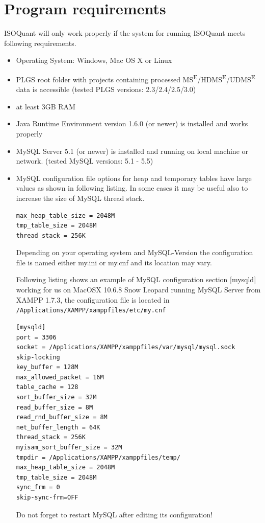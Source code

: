 \documentclass[]{article}
\begin{document}
\clearpage

\section{Program requirements}\label{program-requirements}

ISOQuant will only work properly if the system for running ISOQuant
meets following requirements.

\begin{itemize}
\item
  Operating System: Windows, Mac OS X or Linux
\item
  PLGS root folder with projects containing processed
  MS\textsuperscript{E}/HDMS\textsuperscript{E}/UDMS\textsuperscript{E}
  data is accessible (tested PLGS versions: 2.3/2.4/2.5/3.0)
\item
  at least 3GB RAM
\item
  Java Runtime Environment version 1.6.0 (or newer) is installed and
  works properly
\item
  MySQL Server 5.1 (or newer) is installed and running on local machine
  or network. (tested MySQL versions: 5.1 - 5.5)
\item
  MySQL configuration file options for heap and temporary tables have
  large values as shown in following listing. In some cases it may be
  useful also to increase the size of MySQL thread stack.

\begin{lstlisting}
max_heap_table_size = 2048M
tmp_table_size = 2048M
thread_stack = 256K
\end{lstlisting}

  Depending on your operating system and MySQL-Version the configuration
  file is named either my.ini or my.cnf and its location may vary.

  Following listing shows an example of MySQL configuration section
  {[}mysqld{]} working for us on MacOSX 10.6.8 Snow Leopard running
  MySQL Server from XAMPP 1.7.3, the configuration file is located in
  \lstinline!/Applications/XAMPP/xamppfiles/etc/my.cnf!

\begin{lstlisting}
[mysqld]
port = 3306
socket = /Applications/XAMPP/xamppfiles/var/mysql/mysql.sock
skip-locking
key_buffer = 128M
max_allowed_packet = 16M
table_cache = 128
sort_buffer_size = 32M
read_buffer_size = 8M
read_rnd_buffer_size = 8M
net_buffer_length = 64K
thread_stack = 256K
myisam_sort_buffer_size = 32M
tmpdir = /Applications/XAMPP/xamppfiles/temp/
max_heap_table_size = 2048M
tmp_table_size = 2048M
sync_frm = 0
skip-sync-frm=OFF
\end{lstlisting}

  Do not forget to restart MySQL after editing its configuration!
\end{itemize}
\end{document}
